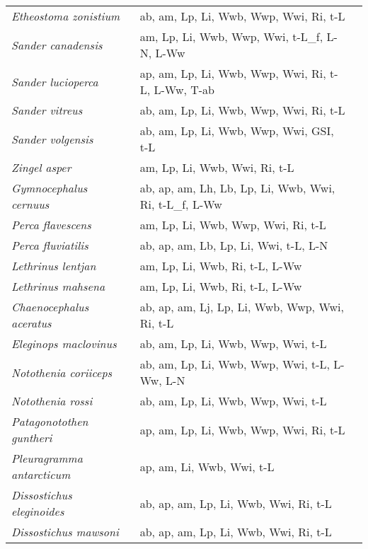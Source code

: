 {\begin{longtable}[c]{p{3.5cm}p{5.5cm}p{5.5cm}}
\emph{Etheostoma zonistium} &  ab, am, Lp, Li, Wwb, Wwp, Wwi, Ri, t-L & \citet{CarnBurr1989} \\
\emph{Sander canadensis} &  am, Lp, Li, Wwb, Wwp, Wwi, t-L\_f, L-N, L-Ww & \citet{JohnLysa2012,Caru1963} \\
\emph{Sander lucioperca} &  ap, am, Lp, Li, Wwb, Wwp, Wwi, Ri, t-L, L-Ww, T-ab & \citet{Aart2007} \\
\emph{Sander vitreus} &  ab, am, Lp, Li, Wwb, Wwp, Wwi, Ri, t-L & \citet{Aart2007,HeRuds2005} \\
\emph{Sander volgensis} &  ab, am, Lp, Li, Wwb, Wwp, Wwi, GSI, t-L & \citet{Aart2007,MishRasp2016,Kuzn2010} \\
\emph{Zingel asper} &  am, Lp, Li, Wwb, Wwi, Ri, t-L & \citet{DanaLabo2007} \\
\emph{Gymnocephalus cernuus} &  ab, ap, am, Lh, Lb, Lp, Li, Wwb, Wwi, Ri, t-L\_f, L-Ww & \citet{Emme2004} \\
\emph{Perca flavescens} &  am, Lp, Li, Wwb, Wwp, Wwi, Ri, t-L & \citet{RyanHarv1980} \\
\emph{Perca fluviatilis} &  ab, ap, am, Lb, Lp, Li, Wwi, t-L, L-N & \citet{PersRoos2004,Jell1980} \\
\emph{Lethrinus lentjan} &  am, Lp, Li, Wwb, Ri, t-L, L-Ww & \citet{DegoAli2013,Wass1991} \\
\emph{Lethrinus mahsena} &  am, Lp, Li, Wwb, Ri, t-L, L-Ww & \citet{DegoAli2013,Wass1991} \\
\emph{Chaenocephalus aceratus} &  ab, ap, am, Lj, Lp, Li, Wwb, Wwp, Wwi, Ri, t-L & \citet{Trac2015} \\
\emph{Eleginops maclovinus} &  ab, am, Lp, Li, Wwb, Wwp, Wwi, t-L & \citet{LicaBarr2006,BricArkh2005} \\
\emph{Notothenia coriiceps} &  ab, am, Lp, Li, Wwb, Wwp, Wwi, t-L, L-Ww, L-N & \citet{PostYan2016,CaliRigi2017,WhitVeit1996,LinkZuko1980} \\
\emph{Notothenia rossi} &  ab, am, Lp, Li, Wwb, Wwp, Wwi, t-L & \citet{Burc1983} \\
\emph{Patagonotothen guntheri} &  ap, am, Lp, Li, Wwb, Wwp, Wwi, Ri, t-L & \citet{ColliShree2008,BricLapt2005} \\
\emph{Pleuragramma antarcticum} &  ap, am, Li, Wwb, Wwi, t-L & \citet{HuboTomo1989} \\
\emph{Dissostichus eleginoides} &  ab, ap, am, Lp, Li, Wwb, Wwi, Ri, t-L & \citet{Horn2002} \\
\emph{Dissostichus mawsoni} &  ab, ap, am, Lp, Li, Wwb, Wwi, Ri, t-L & \citet{Horn2002} \\

\end{longtable}}
